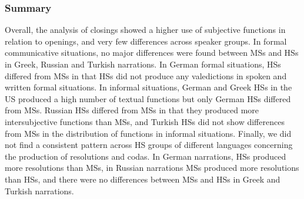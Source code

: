 \documentclass[output=paper,colorlinks,citecolor=brown]{langscibook}
\begin{document}
\subsubsection{Summary}
Overall, the analysis of closings showed a higher use of subjective functions in relation to openings, and very few differences across speaker groups. In formal communicative situations, no major differences were found between MSs and HSs in Greek, Russian and Turkish narrations. In German formal situations, HSs differed from MSs in that HSs did not produce any valedictions in spoken and written formal situations. In informal situations, German and Greek HSs in the US produced a high number of textual functions but only German HSs differed from MSs. Russian HSs differed from MSs in that they produced more intersubjective functions than MSs, and Turkish HSs did not show differences from MSs in the distribution of functions in informal situations. Finally, we did not find a consistent pattern across HS groups of different languages concerning the production of resolutions and codas. In German narrations, HSs produced more resolutions than MSs, in Russian narrations MSs produced more resolutions than HSs, and there were no differences between MSs and HSs in Greek and Turkish narrations. 
\end{document}
